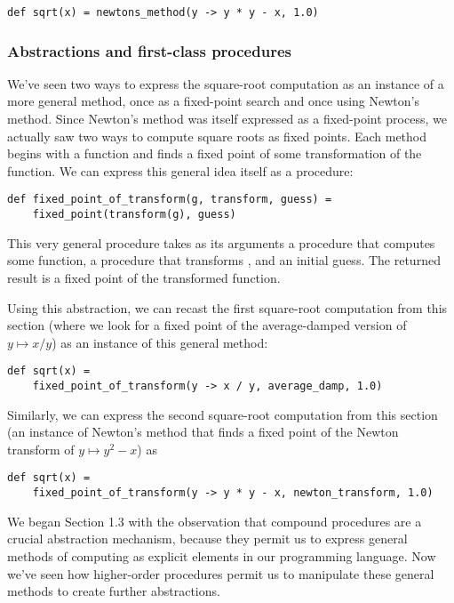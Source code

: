 \begin{lstlisting}[style=slate]
def sqrt(x) = newtons_method(y -> y * y - x, 1.0)
\end{lstlisting}

\subsubsection{Abstractions and first-class procedures}

We've seen two ways to express the square-root computation as an instance of a more general method, once as a fixed-point search and once using Newton's method. Since Newton's method was itself expressed as a fixed-point process, we actually saw two ways to compute square roots as fixed points. Each method begins with a function and finds a fixed point of some transformation of the function. We can express this general idea itself as a procedure:

\begin{lstlisting}[style=slate]
def fixed_point_of_transform(g, transform, guess) =
    fixed_point(transform(g), guess)
\end{lstlisting}

This very general procedure takes as its arguments a procedure  that computes some function, a procedure that transforms , and an initial guess. The returned result is a fixed point of the transformed function.

Using this abstraction, we can recast the first square-root computation from this section (where we look for a fixed point of the average-damped version of $y \mapsto x/y$) as an instance of this general method:

\begin{lstlisting}[style=slate]
def sqrt(x) = 
    fixed_point_of_transform(y -> x / y, average_damp, 1.0)
\end{lstlisting}

Similarly, we can express the second square-root computation from this section (an instance of Newton's method that finds a fixed point of the Newton transform of $y \mapsto y^2 - x$) as

\begin{lstlisting}[style=slate]
def sqrt(x) = 
    fixed_point_of_transform(y -> y * y - x, newton_transform, 1.0)
\end{lstlisting}

We began Section 1.3 with the observation that compound procedures are a crucial abstraction mechanism, because they permit us to express general methods of computing as explicit elements in our programming language. Now we've seen how higher-order procedures permit us to manipulate these general methods to create further abstractions.

